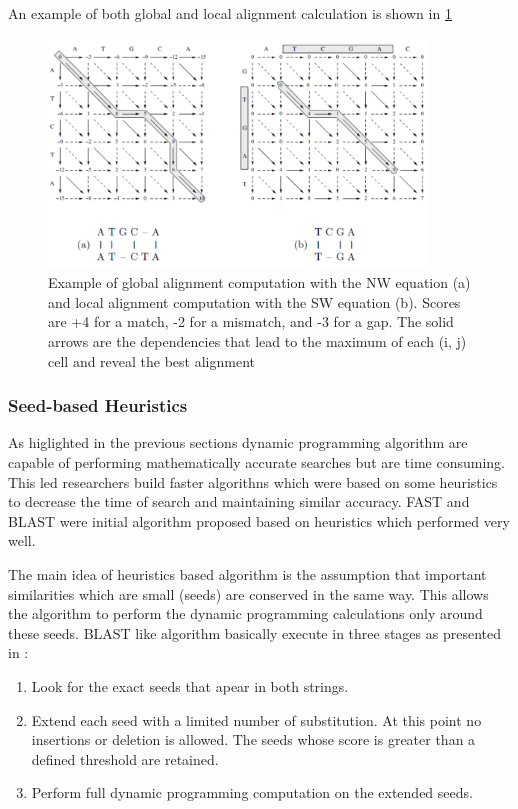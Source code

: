 \documentclass[12pt,twoside]{article}
\begin{document}
An example of both global and local alignment calculation is shown in \cref{fig:alignexample}
\begin{figure}%
    \centering
    \includegraphics[width=0.9\textwidth]{fig/alignexample}
    \caption{Example of global alignment computation with the NW equation (a) and
	local alignment computation with the SW equation (b). Scores are +4 for a match,
	-2 for a mismatch, and -3 for a gap. The solid arrows are the dependencies that
	lead to the maximum of each (i, j) cell and reveal the best alignment \cite[Figure 8.4]{gokhale_reconfigurable_2010}}
    \label{fig:alignexample}
\end{figure}

\subsubsection{Seed-based Heuristics}

As higlighted in the previous sections dynamic programming algorithm are capable of performing mathematically accurate 
searches but are time consuming. This led researchers build faster algorithns which were based on some heuristics
to decrease the time of search and maintaining similar accuracy. FAST \cite{pearson_improved_1988} and BLAST \cite{altschul_basic_1990}
were initial algorithm proposed based on heuristics which performed very well.

The main idea of heuristics based algorithm is the assumption that important similarities which are small (seeds) are conserved in the same
way. This allows the algorithm to perform the dynamic programming calculations only around these seeds. BLAST like algorithm basically
execute in three stages as presented in \cite{gokhale_reconfigurable_2010}:

\begin{enumerate}
	\item Look for the exact seeds that apear in both strings.
	\item Extend each seed with a limited number of substitution. At this point no insertions or deletion is allowed.
		  The seeds whose score is greater than a defined threshold are retained.
	\item Perform full dynamic programming computation on the extended seeds.
\end{enumerate}
\end{document}
